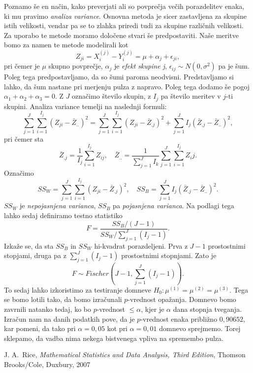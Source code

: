 \documentclass[12pt, letterpaper]{article}
\begin{document}
Poznamo še en način, kako preverjati ali so povprečja večih porazdelitev enaka, ki mu pravimo \emph{analiza variance}. Osnovna metoda je sicer zastavljena za skupine istih velikosti, vendar pa se to zlahka priredi tudi za skupine različnih velikosti. Za uporabo te metode moramo določene stvari še predpostaviti. Naše meritve bomo za namen te metode modelirali kot
\[
Z_{ji} = X_i^{(j)} - Y_i^{(j)} = \mu + \alpha_j + \epsilon_{ji},
\]
pri čemer je $\mu$ skupno povprečje, $\alpha_j$ je \emph{efekt skupine j}, $\epsilon_{ij} \sim N(0, \sigma^2)$ pa je šum. Poleg tega predpostavljamo, da so šumi paroma neodvisni. Predstavljamo si lahko, da šum nastane pri merjenju pulza z napravo. Poleg tega dodamo še pogoj $\alpha_1 + \alpha_2 + \alpha_3 = 0$. Z $J$ označimo število skupin, z $I_j$ pa število meritev v $j$-ti skupini. Analiza variance temelji na naslednji formuli:
\[
\sum_{j=1}^J\sum_{i=1}^{I_j}(Z_{ji} - \bar{Z}_{..})^2 = \sum_{j=1}^J\sum_{i=1}^{I_j}(Z_{ji} - \bar{Z}_{.j})^2 + \sum_{j=1}^JI_j(\bar{Z}_{.j} - \bar{Z}_{..})^2,
\]
pri čemer sta
\[
\bar{Z}_{.j} = \frac{1}{I_j}\sum_{i=1}^{I_j} Z_{ij}, \quad \bar{Z}_{..} = \frac{1}{\sum_{j=1}^JI_k}\sum_{j=1}^J\sum_{i=1}^{I_j}Z_ij.
\]
Označimo
\[
SS_W = \sum_{j=1}^J\sum_{i=1}^{I_j}(Z_{ji} - \bar{Z}_{.j})^2, \quad SS_B = \sum_{j=1}^JI_j(\bar{Z}_{.j} - \bar{Z}_{..})^2.
\]
$SS_W$ je \emph{nepojasnjena varianca}, $SS_B$ pa \emph{pojasnjena varianca}.
Na podlagi tega lahko sedaj definiramo testno statistiko
\[
F = \frac{SS_B / (J-1)}{SS_W / \sum_{j=1}^J(I_j - 1)}.
\]
Izkaže se, da sta $SS_B$ in $SS_W$ hi-kvadrat porazdeljeni. Prva z $J-1$ prostostnimi stopjami, druga pa z $\sum_{j=1}^J(I_j - 1)$ prostostnimi stopnjami. Zato je
\[
F \sim Fischer(J-1, \sum_{j=1}^J(I_j - 1)).
\]
To sedaj lahko izkoristimo za testiranje domneve $H_0: \mu^{(1)} = \mu^{(2)} = \mu^{(3)}$. Tega se bomo lotili tako, da bomo izračunali $p$-vrednost opažanja. Domnevo bomo zavrnili natanko tedaj, ko bo $p$-vrednost $\leq \alpha$, kjer je $\alpha$ dana stopnja tveganja. Izračun nam na danih podatkih pove, da je $p$-vrednost enaka približno $0,90652$, kar pomeni, da tako pri $\alpha = 0,05$ kot pri $\alpha = 0,01$ domnevo sprejmemo. Torej sklepamo, da vadba nima nekega bistvenega vpliva na spremembo pulza.


\begin{thebibliography}{99}
 J. A.~Rice, \emph{Mathematical Statistics and Data Analysis, Third Edition}, Thomson Brooks/Cole, Duxbury, 2007
\end{thebibliography}
\end{document}
